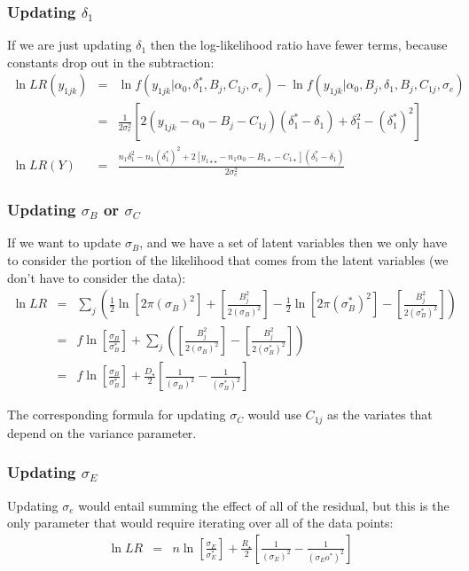 \documentclass[11pt]{article}
\begin{document}
\subsubsection*{Updating $\delta_1$}
If we are just updating $\delta_1$ then the log-likelihood ratio have fewer terms, because constants drop out in the subtraction:
\begin{eqnarray*}
\ln LR(y_{1jk}) & = &  \ln f(y_{1jk}|\alpha_0,\delta_1^{\ast}, B_j,C_{1j},\sigma_e) - \ln f(y_{1jk}|\alpha_0, B_j,\delta_1, B_j,C_{1j},\sigma_e) \\
		& = &  \frac{1}{2\sigma_e^2}  \left[2 \left(y_{1jk} -\alpha_0 - B_j-C_{1j}\right)(\delta_1^\ast - \delta_1) + \delta_1^2- (\delta_1^{\ast})^2\right]\\
\ln LR(Y) & = & \frac{n_1\delta_1^2 - n_1(\delta_1^{\ast})^2  + 2\left[y_{1\star\star} - n_1\alpha_0  - B_{1\star}  - C_{1\star}\right](\delta_1^\ast - \delta_1)}{2\sigma_e^2} 
\end{eqnarray*}

\subsubsection*{Updating $\sigma_B$ or $\sigma_C$}
If we want to update $\sigma_B$, and we have a set of latent variables then we only have to consider the portion of the likelihood that comes from the latent variables (we don't have to consider the data):
\begin{eqnarray*}
\ln LR & = & \sum_j \left(\frac{1}{2}\ln\left[2\pi(\sigma_B)^2\right] + \left[{\frac{B_j^2}{2(\sigma_B)^2}}\right] -\frac{1}{2}\ln\left[2\pi(\sigma_B^{\ast})^2\right] - \left[{\frac{B_j^2}{2(\sigma_B^{\ast})^2}}\right]\right) \\
& = & f  \ln\left[\frac{\sigma_B}{\sigma_B^{\ast}}\right] + \sum_j \left( \left[{\frac{B_j^2}{2(\sigma_B)^2}}\right]  - \left[{\frac{B_j^2}{2(\sigma_B^{\ast})^2}}\right]\right) \\
& = & f  \ln\left[\frac{\sigma_B}{\sigma_B^{\ast}}\right] + \frac{D_{\star}}{2}\left[{\frac{1}{(\sigma_B)^2}} - {\frac{1}{(\sigma_B^{\ast})^2}}\right]
\end{eqnarray*}

The corresponding formula for updating $\sigma_C$  would use $C_{1j}$ as the variates that depend on the variance parameter.

\subsubsection*{Updating $\sigma_E$}
Updating $\sigma_e$ would entail summing the effect of all of the residual, but this is the only parameter that would require iterating over all of the data points:
\begin{eqnarray*}
\ln LR & = & n  \ln\left[\frac{\sigma_E}{\sigma_E^{\ast}}\right] + \frac{R_{\star}}{2}\left[{\frac{1}{(\sigma_E)^2}} - {\frac{1}{(\sigma_Eo^{\ast})^2}}\right]
\end{eqnarray*}
\end{document}
